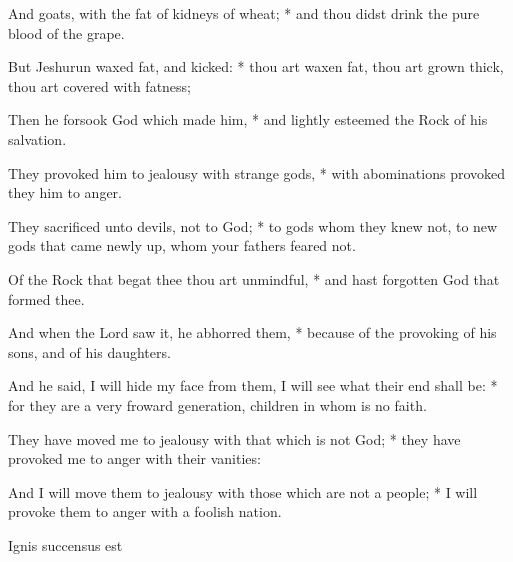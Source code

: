 \begin{multicols}{2}
And goats, with the fat of kidneys of wheat; * and thou didst drink the pure blood of the grape.\par
But Jeshurun waxed fat, and kicked: * thou art waxen fat, thou art grown thick, thou art covered with fatness;\par
Then he forsook God which made him, * and lightly esteemed the Rock of his salvation.\par
They provoked him to jealousy with strange gods, * with abominations provoked they him to anger.\par
They sacrificed unto devils, not to God; * to gods whom they knew not, to new gods that came newly up, whom your fathers feared not.\par
Of the Rock that begat thee thou art unmindful, * and hast forgotten God that formed thee.\par
And when the Lord saw it, he abhorred them, * because of the provoking of his sons, and of his daughters.\par
And he said, I will hide my face from them, {\dag} I will see what their end shall be: * for they are a very froward generation, children in whom is no faith.\par
They have moved me to jealousy with that which is not God; * they have provoked me to anger with their vanities:\par
And I will move them to jealousy with those which are not a people; * I will provoke them to anger with a foolish nation.

\begin{inhead}
Ignis succensus est
\end{inhead}


\end{multicols}
